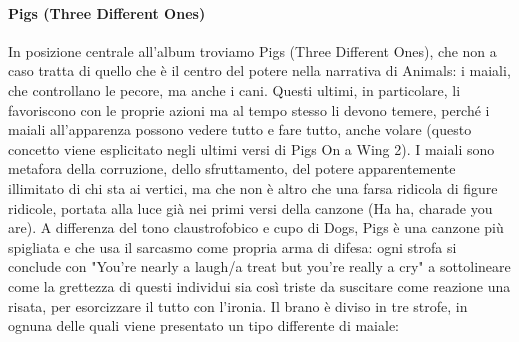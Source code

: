 \documentclass[class=book, crop=false, oneside, 12pt]{standalone}
\begin{document}
    \paragraph{Pigs (Three Different Ones)}
    In posizione centrale all'album troviamo Pigs (Three Different Ones), che non a caso tratta di quello che è il centro del potere nella narrativa di Animals: i maiali, che controllano le pecore, ma anche i cani. Questi ultimi, in particolare, li favoriscono con le proprie azioni ma al tempo stesso li devono temere, perché i maiali all'apparenza possono vedere tutto e fare tutto, anche volare (questo concetto viene esplicitato negli ultimi versi di Pigs On a Wing 2). I maiali sono metafora della corruzione, dello sfruttamento, del potere apparentemente illimitato di chi sta ai vertici, ma che non è altro che una farsa ridicola di figure ridicole, portata alla luce già nei primi versi della canzone (Ha ha, charade you are). A differenza del tono claustrofobico e cupo di Dogs, Pigs è una canzone più spigliata e che usa il sarcasmo come propria arma di difesa: ogni strofa si conclude con "You're nearly a laugh/a treat but you're really a cry" a sottolineare come la grettezza di questi individui sia così triste da suscitare come reazione una risata, per esorcizzare il tutto con l'ironia. Il brano è diviso in tre strofe, in ognuna delle quali viene presentato un tipo differente di maiale:
\end{document}
